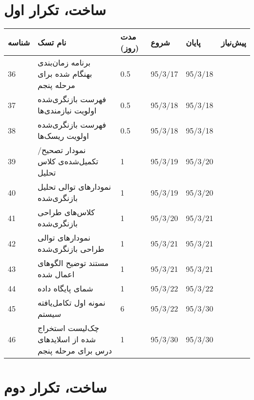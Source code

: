 \section{ساخت، تکرار اول}

\begin{tabular}[H]{ | l | l | l | l | l | l | }
	\hline
	شناسه & نام تسک & مدت (روز) & شروع & پایان & پیش‌نیاز    \\ \hline
	36 & برنامه زمان‌بندی بهنگام شده برای مرحله پنجم & 0.5   &   95/3/17 &   95/3/18 &  \\ \hline
	37 &  فهرست بازنگری‌شده اولویت نیازمندی‌ها & 0.5   &   95/3/18 &   95/3/18 &  \\ \hline
	38 &  فهرست بازنگری‌شده اولویت ریسک‌ها & 0.5   &   95/3/18 &   95/3/18 &  \\ \hline
	39 & نمودار تصحیح/تکمیل‌شده‌ی کلاس تحلیل & 1   &   95/3/19 &   95/3/20 &  \\ \hline
	40 & نمودارهای توالی تحلیل بازنگری‌شده & 1   &   95/3/19 &   95/3/20 &  \\ \hline
	41 & کلاس‌های طراحی بازنگری‌شده & 1   &   95/3/20 &   95/3/21 &  \\ \hline
	42 & نمودارهای توالی طراحی بازنگری‌شده & 1   &   95/3/21 &   95/3/21 &  \\ \hline
	43 & مستند توضیح الگوهای اعمال شده & 1   &   95/3/21 &   95/3/21 &  \\ \hline
	44 & شمای پایگاه داده & 1   &   95/3/22 &   95/3/22 &  \\ \hline
	45 & نمونه اول تکامل‌یافته سیستم & 6   &   95/3/22 &   95/3/30 &  \\ \hline
	46 & چک‌‌لیست استخراج شده از اسلایدهای درس برای مرحله پنجم & 1   &   95/3/30 &   95/3/30 &  \\ \hline
\end{tabular}

\newpage
\section{ساخت، تکرار دوم}


